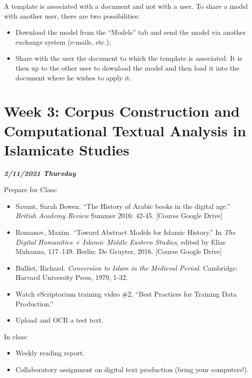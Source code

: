 \documentclass[
]{book}
\providecommand{\tightlist}{%
  \setlength{\itemsep}{0pt}\setlength{\parskip}{0pt}}
\begin{document}
A template is associated with a document and not with a user. To share a
model with another user, there are two possibilities:

\begin{itemize}
\item
  Download the model from the ``Models'' tab and send the model via
  another exchange system (e-mails, etc.);
\item
  Share with the user the document to which the template is
  associated. It is then up to the other user to download the model
  and then load it into the document where he wishes to apply it.
\end{itemize}

\hypertarget{week-3-corpus-construction-and-computational-textual-analysis-in-islamicate-studies-1}{%
\chapter{Week 3: Corpus Construction and Computational Textual Analysis in Islamicate Studies}\label{week-3-corpus-construction-and-computational-textual-analysis-in-islamicate-studies-1}}

\textbf{\emph{2/11/2021 Thursday}}

Prepare for Class:

\begin{itemize}
\tightlist
\item
  Savant, Sarah Bowen. ``The History of Arabic books in the digital age.'' \emph{British Academy Review} Summer 2016: 42-45. {[}Course Google Drive{]}\\
\item
  Romanov, Maxim. ``Toward Abstract Models for Islamic History.'' In \emph{The Digital Humanities + Islamic Middle Eastern Studies}, edited by Elias Muhanna, 117--149. Berlin: De Gruyter, 2016. {[}Course Google Drive{]}
\item
  Bulliet, Richard. \emph{Conversion to Islam in the Medieval Period}. Cambridge: Harvard University Press, 1979, 1-32.
\item
  Watch eScriptorium training video \#2, ``Best Practices for Training Data Production.''
\item
  Upload and OCR a test text.
\end{itemize}

In class:

\begin{itemize}
\tightlist
\item
  Weekly reading report.
\item
  Collaboratory assignment on digital text production (bring your computers!).
\end{itemize}
\end{document}
